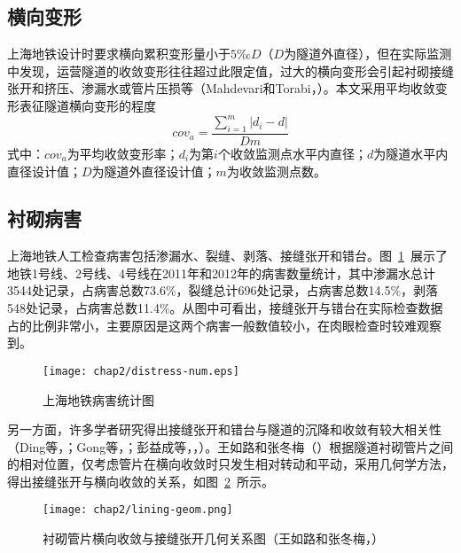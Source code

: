 \subsection{横向变形}

上海地铁设计时要求横向累积变形量小于$5‰D$（$D$为隧道外直径），但在实际监测中发现，运营隧道的收敛变形往往超过此限定值，过大的横向变形会引起衬砌接缝张开和挤压、渗漏水或管片压损等（Mahdevari和Torabi，\citeyear{mahdevari2012prediction}）。本文采用平均收敛变形表征隧道横向变形的程度
\begin{equation}
    \label{equ:conv_ave}
    {{cov}_{a}}=\frac{\sum\limits_{i=1}^{m}{\left| {{d}_{i}}-d \right|}}{Dm}
\end{equation}
式中：${cov}_{a}$为平均收敛变形率；${d}_{i}$为第$i$个收敛监测点水平内直径；$d$为隧道水平内直径设计值；$D$为隧道外直径设计值；$m$为收敛监测点数。

\subsection{衬砌病害}

上海地铁人工检查病害包括渗漏水、裂缝、剥落、接缝张开和错台。图~\ref{fig:上海地铁病害统计图}~展示了地铁1号线、2号线、4号线在2011年和2012年的病害数量统计，其中渗漏水总计3544处记录，占病害总数73.6\%，裂缝总计696处记录，占病害总数14.5\%，剥落548处记录，占病害总数11.4\%。从图中可看出，接缝张开与错台在实际检查数据占的比例非常小，主要原因是这两个病害一般数值较小，在肉眼检查时较难观察到。

\begin{figure}[htbp]
    \centering
    \texttt{[image: chap2/distress-num.eps]}
    \caption{上海地铁病害统计图}
    \label{fig:上海地铁病害统计图}
\end{figure}

另一方面，许多学者研究得出接缝张开和错台与隧道的沉降和收敛有较大相关性（Ding等，\citeyear{ding2013full}；Gong等，\citeyear{gong2017comparison}；彭益成等，\citeyear{彭益成2013盾构隧道衬砌结构的壳}，）。王如路和张冬梅（\citeyear{王如路2013超载作用下软土盾构隧道横向变形机理及控制指标研究}）根据隧道衬砌管片之间的相对位置，仅考虑管片在横向收敛时只发生相对转动和平动，采用几何学方法，得出接缝张开与横向收敛的关系，如图~\ref{fig:衬砌管片横向收敛与接缝张开几何关系图}~所示。

\begin{figure}[htbp]
    \centering
    \texttt{[image: chap2/lining-geom.png]}
    \caption{衬砌管片横向收敛与接缝张开几何关系图（王如路和张冬梅，\citeyear{王如路2013超载作用下软土盾构隧道横向变形机理及控制指标研究}）}
    \label{fig:衬砌管片横向收敛与接缝张开几何关系图}
\end{figure}

